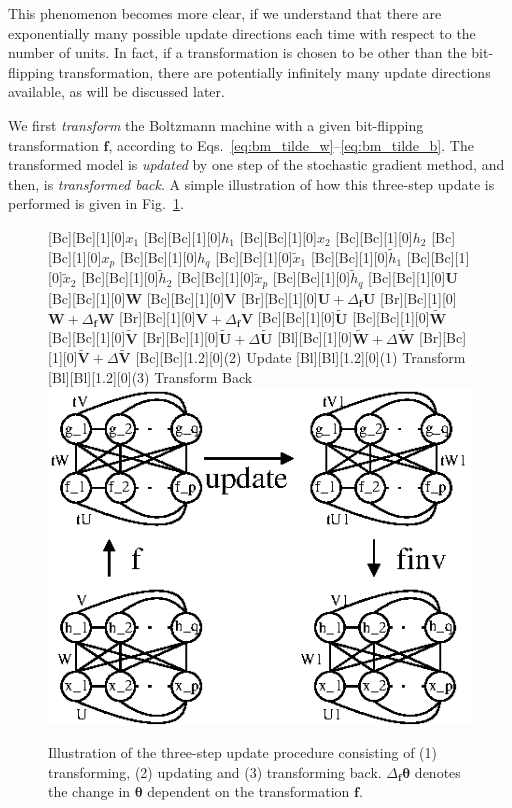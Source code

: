 \documentclass[dissertation,nocontribution]{aaltoseries}
\newcommand{\vect}[1]{\mathbf{#1}}
\newcommand{\vects}[1]{\boldsymbol{#1}}
\newcommand{\matr}[1]{\mathbf{#1}}
\newcommand{\vf}[0]{\vect{f}}
\newcommand{\mW}[0]{\matr{W}}
\newcommand{\mU}[0]{\matr{U}}
\newcommand{\mV}[0]{\matr{V}}
\newcommand{\TT}[0]{{\vects{\theta}}}
\begin{document}
This phenomenon becomes more clear, if we understand that
there are exponentially many possible update directions each
time with respect to the number of units. In fact, if a
transformation is chosen to be other than the bit-flipping
transformation, there are potentially infinitely many update
directions available, as will be discussed later.

We first
\textit{transform} the Boltzmann machine with a given
bit-flipping transformation $\vf$, according to
Eqs.~\eqref{eq:bm_tilde_w}--\eqref{eq:bm_tilde_b}. The
transformed model is \textit{updated} by one step of the
stochastic gradient method, and then, is \textit{transformed
back}. A simple illustration of how this three-step update
is performed is given in
Fig.~\ref{fig:bm_three_step_update}.

\begin{figure}[t]
    \centering
    [Bc][Bc][1][0]{$x_1$}
    [Bc][Bc][1][0]{$h_1$}
    [Bc][Bc][1][0]{$x_2$}
    [Bc][Bc][1][0]{$h_2$}
    [Bc][Bc][1][0]{$x_p$}
    [Bc][Bc][1][0]{$h_q$}
    [Bc][Bc][1][0]{$\tilde{x}_1$}
    [Bc][Bc][1][0]{$\tilde{h}_1$}
    [Bc][Bc][1][0]{$\tilde{x}_2$}
    [Bc][Bc][1][0]{$\tilde{h}_2$}
    [Bc][Bc][1][0]{$\tilde{x}_p$}
    [Bc][Bc][1][0]{$\tilde{h}_q$}
    [Bc][Bc][1][0]{$\mU$}
    [Bc][Bc][1][0]{$\mW$}
    [Bc][Bc][1][0]{$\mV$}
    [Br][Bc][1][0]{$\mU+\Delta_\vf \mU$}
    [Br][Bc][1][0]{$\mW+\Delta_\vf \mW$}
    [Br][Bc][1][0]{$\mV+\Delta_\vf \mV$}
    [Bc][Bc][1][0]{$\tilde{\mU}$}
    [Bc][Bc][1][0]{$\tilde{\mW}$}
    [Bc][Bc][1][0]{$\tilde{\mV}$}
    [Br][Bc][1][0]{$\tilde{\mU}+\Delta\tilde{\mU}$}
    [Bl][Bc][1][0]{$\tilde{\mW}+\Delta\tilde{\mW}$}
    [Br][Bc][1][0]{$\tilde{\mV}+\Delta\tilde{\mV}$}
    [Bc][Bc][1.2][0]{(2) Update}
    [Bl][Bl][1.2][0]{(1) Transform}
    [Bl][Bl][1.2][0]{(3) Transform Back}
    \includegraphics[width=0.8\columnwidth]{figures/fbm_3step.eps}
    \caption{Illustration of the three-step update procedure
    consisting of (1) transforming, (2) updating and (3)
    transforming back. $\Delta_\vf \TT$ denotes the change
    in $\TT$ dependent on the transformation $\vf$.}
    \label{fig:bm_three_step_update}
\end{figure}
\end{document}
